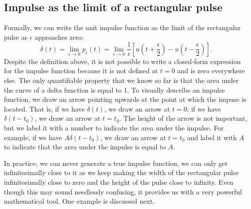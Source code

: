 \subsection{Impulse as the limit of a rectangular pulse}
Formally, we can write the unit impulse function as the limit of the rectangular pulse as $\epsilon$ approaches zero:
\[
\delta(t) = \lim_{\epsilon \to 0} p_\epsilon(t) = \lim_{\epsilon \to 0} \frac{1}{\epsilon} \left[u\left(t + \frac{\epsilon}{2}\right) - u\left(t - \frac{\epsilon}{2}\right)\right].
\]
Despite the definition above, it is not possible to write a closed-form expression for the impulse function because it is not defined at $t = 0$ and is zero everywhere else. The only quantifiable property that we know so far is that the area under the curve of a delta function is equal to 1. To visually describe an impulse function, we draw an arrow pointing upwards at the point at which the impuse is located. That is, if we have $\delta(t)$, we draw an arrow at $t = 0$; if we have $\delta(t - t_0)$, we draw an arrow at $t = t_0$. The height of the arrow is not important, but we label it with a number to indicate the area under the impulse. For example, if we have $A \delta(t - t_0)$, we draw an arrow at $t = t_0$ and label it with $A$ to indicate that the area under the impulse is equal to $A$.

In practice, we can never generate a true impulse function, we can only get infinitesimally close to it as we keep making the width of the rectangular pulse infinitesimally close to zero and the height of the pulse close to infinity. Even though this may sound needlessly confusing, it provides us with a very powerful mathematical tool. One example is discussed next.
